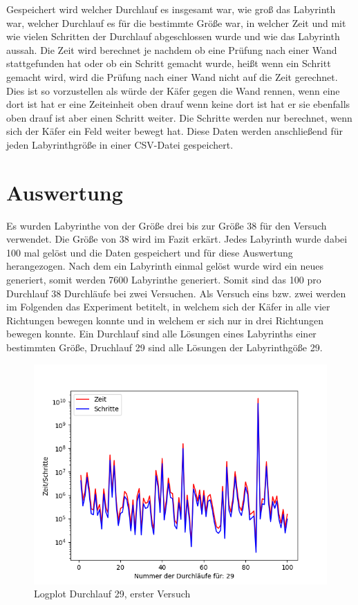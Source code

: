\documentclass[12pt, a4paper, titlepage]{article}
\begin{document}
Gespeichert wird welcher Durchlauf es insgesamt war, wie groß das Labyrinth war, welcher Durchlauf es für die bestimmte Größe war, in welcher Zeit und mit wie vielen Schritten der Durchlauf abgeschlossen wurde und wie das Labyrinth aussah.
Die Zeit wird berechnet je nachdem ob eine Prüfung nach einer Wand stattgefunden hat oder ob ein Schritt gemacht wurde, heißt wenn ein Schritt gemacht wird, wird die Prüfung nach einer Wand nicht auf die Zeit gerechnet.
Dies ist so vorzustellen als würde der Käfer gegen die Wand rennen, wenn eine dort ist hat er eine Zeiteinheit oben drauf wenn keine dort ist hat er sie ebenfalls oben drauf ist aber einen Schritt weiter.
Die Schritte werden nur berechnet, wenn sich der Käfer ein Feld weiter bewegt hat.
Diese Daten werden anschließend für jeden Labyrinthgröße in einer CSV-Datei gespeichert.

\section{Auswertung}

Es wurden Labyrinthe von der Größe drei bis zur Größe 38 für den Versuch verwendet. Die Größe von 38 wird im Fazit erkärt.
Jedes Labyrinth wurde dabei 100 mal gelöst und die Daten gespeichert und für diese Auswertung herangezogen.
Nach dem ein Labyrinth einmal gelöst wurde wird ein neues generiert, somit werden 7600 Labyrinthe generiert. Somit sind das 100 pro Durchlauf 38 Durchläufe bei zwei Versuchen.
Als Versuch eins bzw. zwei werden im Folgenden das Experiment betitelt, in welchem sich der Käfer in alle vier Richtungen bewegen konnte und in welchem er sich nur in drei Richtungen bewegen konnte.
Ein Durchlauf sind alle Lösungen eines Labyrinths einer bestimmten Größe, Druchlauf 29 sind alle Lösungen der Labyrinthgöße 29.

\bigskip

\begin{figure}[h]
\centering
\includegraphics[scale=.5]{29_log.png}
\caption{Logplot Durchlauf 29, erster Versuch}
\label{fig:Plot 29}
\end{figure}
\end{document}
